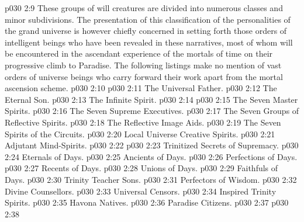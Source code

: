 \vs p030 2:9 \pc These groups of will creatures are divided into numerous classes and minor subdivisions. The presentation of this classification of the personalities of the grand universe is however chiefly concerned in setting forth those orders of intelligent beings who have been revealed in these narratives, most of whom will be encountered in the ascendant experience of the mortals of time on their progressive climb to Paradise. The following listings make no mention of vast orders of universe beings who carry forward their work apart from the mortal ascension scheme.
\vs p030 2:10 \bibnobreakspace {}
\vs p030 2:11 \bibnobreakspace The Universal Father.
\vs p030 2:12 \bibnobreakspace The Eternal Son.
\vs p030 2:13 \bibnobreakspace The Infinite Spirit.
\vs p030 2:14 \bibnobreakspace {}
\vs p030 2:15 \bibnobreakspace The Seven Master Spirits.
\vs p030 2:16 \bibnobreakspace The Seven Supreme Executives.
\vs p030 2:17 \bibnobreakspace The Seven Groups of Reflective Spirits.
\vs p030 2:18 \bibnobreakspace The Reflective Image Aids.
\vs p030 2:19 \bibnobreakspace The Seven Spirits of the Circuits.
\vs p030 2:20 \bibnobreakspace Local Universe Creative Spirits.
\vs p030 2:21 \bibnobreakspace Adjutant Mind\hyp{}Spirits.
\vs p030 2:22 \bibnobreakspace {}
\vs p030 2:23 \bibnobreakspace Trinitized Secrets of Supremacy.
\vs p030 2:24 \bibnobreakspace Eternals of Days.
\vs p030 2:25 \bibnobreakspace Ancients of Days.
\vs p030 2:26 \bibnobreakspace Perfections of Days.
\vs p030 2:27 \bibnobreakspace Recents of Days.
\vs p030 2:28 \bibnobreakspace Unions of Days.
\vs p030 2:29 \bibnobreakspace Faithfuls of Days.
\vs p030 2:30 \bibnobreakspace Trinity Teacher Sons.
\vs p030 2:31 \bibnobreakspace Perfectors of Wisdom.
\vs p030 2:32 \bibnobreakspace Divine Counsellors.
\vs p030 2:33 \bibnobreakspace Universal Censors.
\vs p030 2:34 \bibnobreakspace Inspired Trinity Spirits.
\vs p030 2:35 \bibnobreakspace Havona Natives.
\vs p030 2:36 \bibnobreakspace Paradise Citizens.
\vs p030 2:37 \bibnobreakspace {}
\vs p030 2:38 \bibnobreakspace {}
